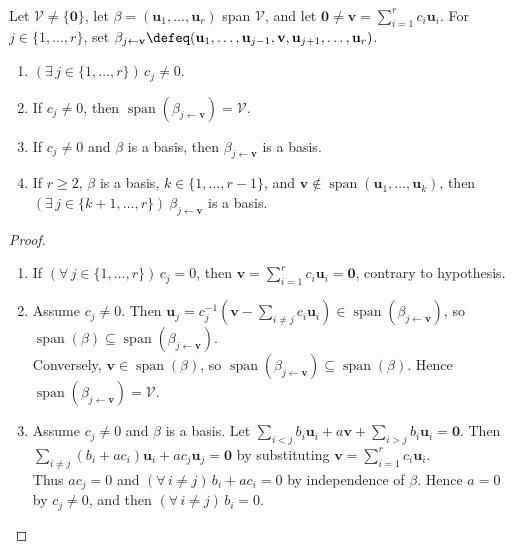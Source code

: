 \begin{lemma} \label{lem:replacement-lemma} \\
Let $\mathcal{V}\neq\{\mathbf{0}\}$, let $\beta=(\mathbf{u}_1,\ldots,\mathbf{u}_r)$ span $\mathcal{V}$, and let $\mathbf{0}\neq\mathbf{v}=\sum\limits_{i=1}^r c_i\mathbf{u}_i$. For $j\in\{1,\ldots,r\}$, set $\beta_{j\leftarrow\mathbf{v}}\defeq(\mathbf{u}_1,\ldots,\mathbf{u}_{j-1},\mathbf{v},\mathbf{u}_{j+1},\ldots,\mathbf{u}_r)$.
\begin{enumerate}[label=(\roman*)]
\setlength{\itemsep}{0pt}
\item $(\exists\,j\in\{1,\ldots,r\})\,c_j\neq0$.
\item If $c_j\neq0$, then $\operatorname{span}(\beta_{j\leftarrow\mathbf{v}})=\mathcal{V}$.
\item If $c_j\neq0$ and $\beta$ is a basis, then $\beta_{j\leftarrow\mathbf{v}}$ is a basis.
\item If $r\geq2$, $\beta$ is a basis, $k\in\{1,\ldots,r-1\}$, and $\mathbf{v}\notin\operatorname{span}(\mathbf{u}_1,\ldots,\mathbf{u}_k)$, then $(\exists\,j\in\{k+1,\ldots,r\})\ \beta_{j\leftarrow\mathbf{v}}$ is a basis.
\end{enumerate}
\begin{proof}
\begin{enumerate}[label=(\roman*)]
\setlength{\itemsep}{0pt}
\item If $(\forall\,j\in\{1,\ldots,r\})\,c_j=0$, then $\mathbf{v}=\sum\limits_{i=1}^{r}c_i\mathbf{u}_i=\mathbf{0}$, contrary to hypothesis.
\item Assume $c_j\neq0$. Then $\mathbf{u}_j=c_j^{-1}\left(\mathbf{v}-\sum\limits_{i\neq j}c_i\mathbf{u}_i\right)\in\operatorname{span}(\beta_{j\leftarrow\mathbf{v}})$, so $\operatorname{span}(\beta)\subseteq\operatorname{span}(\beta_{j\leftarrow\mathbf{v}})$.\\
Conversely, $\mathbf{v}\in\operatorname{span}(\beta)$, so $\operatorname{span}(\beta_{j\leftarrow\mathbf{v}})\subseteq\operatorname{span}(\beta)$. Hence $\operatorname{span}(\beta_{j\leftarrow\mathbf{v}})=\mathcal{V}$.
\item Assume $c_j\neq0$ and $\beta$ is a basis. Let $\sum\limits_{i<j}b_i\mathbf{u}_i+a\mathbf{v}+\sum\limits_{i>j}b_i\mathbf{u}_i=\mathbf{0}$. Then $\sum\limits_{i\neq j}(b_i+ac_i)\mathbf{u}_i+ac_j\mathbf{u}_j=\mathbf{0}$ by substituting $\mathbf{v}=\sum\limits_{i=1}^{r}c_i\mathbf{u}_i$.\\
Thus $ac_j=0$ and $(\forall\,i\neq j)\,b_i+ac_i=0$ by independence of $\beta$. Hence $a=0$ by $c_j\neq0$, and then $(\forall\,i\neq j)\,b_i=0$.\\

\end{enumerate}
\end{proof}
\end{lemma}
